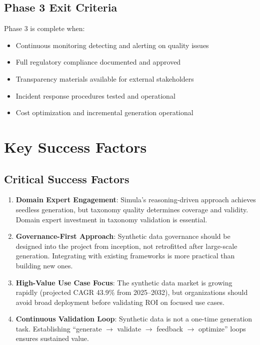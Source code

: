 \subsection{Phase 3 Exit Criteria}

Phase 3 is complete when:
\begin{itemize}
  \item[\checkmark] Continuous monitoring detecting and alerting on quality issues
  \item[\checkmark] Full regulatory compliance documented and approved
  \item[\checkmark] Transparency materials available for external stakeholders
  \item[\checkmark] Incident response procedures tested and operational
  \item[\checkmark] Cost optimization and incremental generation operational
\end{itemize}


\section{Key Success Factors}

\subsection{Critical Success Factors}

\begin{enumerate}
  \item \textbf{Domain Expert Engagement}: Simula's reasoning-driven approach
  achieves seedless generation, but taxonomy quality determines coverage and
  validity. Domain expert investment in taxonomy validation is essential.
  
  \item \textbf{Governance-First Approach}: Synthetic data governance should be
  designed into the project from inception, not retrofitted after large-scale
  generation. Integrating with existing frameworks is more practical than
  building new ones.
  
  \item \textbf{High-Value Use Case Focus}: The synthetic data market is growing
  rapidly (projected CAGR 43.9\% from 2025--2032), but organizations should avoid
  broad deployment before validating ROI on focused use cases.
  
  \item \textbf{Continuous Validation Loop}: Synthetic data is not a one-time
  generation task. Establishing ``generate $\to$ validate $\to$ feedback $\to$
  optimize'' loops ensures sustained value.
\end{enumerate}

